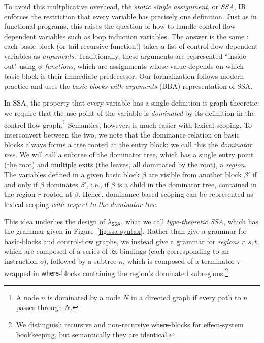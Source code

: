 \documentclass[acmsmall,screen,anonymous,review]{acmart}
\newcommand{\ms}[1]{\ensuremath{\mathsf{#1}}}
\newcommand{\isotopessa}{\(\lambda_{\ms{SSA}}\)}
\begin{document}
To avoid this multplicative overhead, the \emph{static single assignment}, or \emph{SSA}, IR
enforces the restriction that every variable has precisely one definition. Just as in functional
programs, this raises the question of how to handle control-flow dependent variables such as loop
induction variables. The answer is the same \cite{appel-ssa}: each basic block (or tail-recursive
function!) takes a list of control-flow dependent variables as \emph{arguments}. Traditionally,
these arguments are represented ``inside out" using \emph{$\phi$-functions}, which are assignments
whose value depends on which basic block is their immediate predecessor. Our formalization follows
modern practice and uses the \emph{basic blocks with arguments} (BBA) representation of SSA.

In SSA, the property that every variable has a single definition is graph-theoretic: we require that
the use point of the variable is \emph{dominated} by its definition in the control-flow
graph.\footnote{ A node $n$ is dominated by a node $N$ in a directed graph if every path to $n$
passes through $N$. } Semantics, however, is much easier with lexical scoping. To interconvert
between the two, we note that the dominance relation on basic blocks always forms a tree rooted at
the entry block: we call this the \emph{dominator tree}. We will call a subtree of the dominator
tree, which has a single entry point (the root) and multiple exits (the leaves, all dominated by the
root), a \emph{region}. The variables defined in a given basic block $\beta$ are visible from
another block $\beta'$ if and only if $\beta$ dominates $\beta'$, i.e., if $\beta$ is a child in the
dominator tree, contained in the region $r$ rooted at $\beta$. Hence, dominance based scoping can be
represented as lexical scoping \emph{with respect to the dominator tree}.

This idea underlies the design of \isotopessa{}, what we call \emph{type-theoretic SSA}, which has
the grammar given in Figure~\ref{fig:ssa-syntax}. Rather than give a grammar for basic-blocks and
control-flow graphs, we instead give a grammar for \emph{regions} $r, s, t$, which are composed of a
series of \ms{let}-bindings (each corresponding to an instruction $o$), followed by a subtree
$\kappa$, which is composed of a terminator $\tau$ wrapped in \ms{where}-blocks containing the
region's dominated subregions.\footnote{We distinguish recursive and non-recursive \ms{where}-blocks
for effect-system bookkeeping, but semantically they are identical.}
\end{document}
